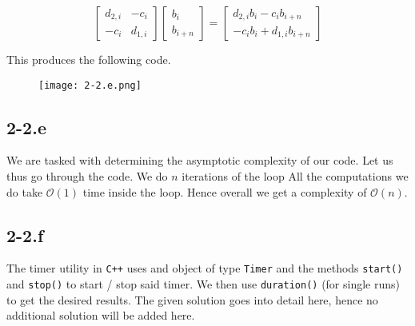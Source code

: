 \documentclass{article}
\begin{document}
\begin{equation*}
    \begin{bmatrix}
        d_{2,i} & -c_{i} \\
        -c_{i} & d_{1,i}
    \end{bmatrix}\begin{bmatrix}
        b_{i} \\ b_{i + n}
    \end{bmatrix} = \begin{bmatrix}
        d_{2,i}b_{i} - c_{i}b_{i+n} \\
        -c_{i}b_{i} + d_{1,i}b_{i+n}
    \end{bmatrix}
\end{equation*}

This produces the following code.
\begin{figure}[!hbt]
    \centering
\texttt{[image: 2-2.e.png]}
\end{figure}

\subsection*{2-2.e}
We are tasked with determining the asymptotic complexity of our code. Let us thus go through the code. We do $n$ iterations of the loop All the computations we do take $\mathcal{O}\left(1\right)$ time inside the loop. Hence overall we get a complexity of $\mathcal{O}\left(n\right)$.

\subsection*{2-2.f}
The timer utility in \verb|C++| uses and object of type \verb|Timer| and the methods \verb|start()| and \verb|stop()| to start / stop said timer. We then use \verb|duration()| (for single runs) to get the desired results. The given solution goes into detail here, hence no additional solution will be added here.
\end{document}
